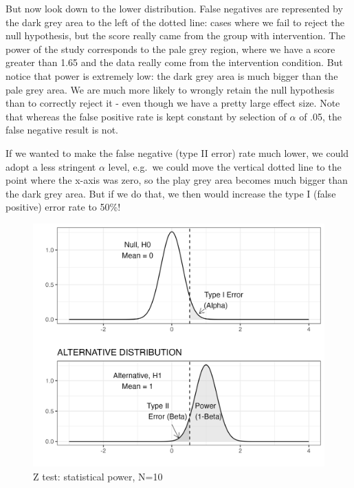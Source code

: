 \documentclass{krantz}
\begin{document}
But now look down to the lower distribution. False negatives are represented by the dark grey area to the left of the dotted line: cases where we fail to reject the null hypothesis, but the score really came from the group with intervention. The power of the study corresponds to the pale grey region, where we have a score greater than 1.65 and the data really come from the intervention condition. But notice that power is extremely low: the dark grey area is much bigger than the pale grey area. We are much more likely to wrongly retain the null hypothesis than to correctly reject it - even though we have a pretty large effect size. Note that whereas the false positive rate is kept constant by selection of \(\alpha\) of .05, the false negative result is not.

If we wanted to make the false negative (type II error) rate much lower, we could adopt a less stringent \(\alpha\) level, e.g.~we could move the vertical dotted line to the point where the x-axis was zero, so the play grey area becomes much bigger than the dark grey area. But if we do that, we then would increase the type I (false positive) error rate to 50\%!

\begin{center}
\begin{figure}
\includegraphics[width=0.6\linewidth]{images_bw/densplot2} \caption{Z test: statistical power, N=10}\label{fig:densplot2}
\end{figure}
\end{center}
\end{document}
